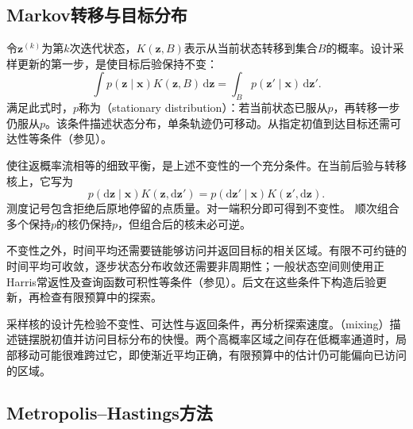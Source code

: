 \subsection{Markov转移与目标分布}
\label{sec:pgm-sampling-markov-kernel}

令$\bm z^{(k)}$为第$k$次迭代状态，$K(\bm z,B)$表示从当前状态转移到集合$B$的概率。设计采样更新的第一步，是使目标后验保持不变：
\begin{equation}
  \int p(\bm{z}\mid\bm{x})K(\bm{z},B)\,\mathrm{d}\bm{z}
    =\int_B p(\bm{z}'\mid\bm{x})\,\mathrm{d}\bm{z}'.
  \label{eq:pgm-sampling-invariance}
\end{equation}
满足此式时，$p$称为（stationary distribution）：若当前状态已服从$p$，再转移一步仍服从$p$。该条件描述状态分布，单条轨迹仍可移动。从指定初值到达目标还需可达性等条件（参见）。

使往返概率流相等的细致平衡，是上述不变性的一个充分条件。在当前后验与转移核上，它写为
\begin{equation}
  p(\mathrm{d}\bm{z}\mid\bm{x})K(\bm{z},\mathrm{d}\bm{z}')
    =p(\mathrm{d}\bm{z}'\mid\bm{x})K(\bm{z}',\mathrm{d}\bm{z}).
  \label{eq:pgm-sampling-detailed-balance}
\end{equation}
测度记号包含拒绝后原地停留的点质量。对一端积分即可得到不变性。
顺次组合多个保持$p$的核仍保持$p$，但组合后的核未必可逆。

不变性之外，时间平均还需要链能够访问并返回目标的相关区域。有限不可约链的时间平均可收敛，逐步状态分布收敛还需要非周期性；一般状态空间则使用正Harris常返性及查询函数可积性等条件（参见）。后文在这些条件下构造后验更新，再检查有限预算中的探索。

采样核的设计先检验不变性、可达性与返回条件，再分析探索速度。（mixing）描述链摆脱初值并访问目标分布的快慢。两个高概率区域之间存在低概率通道时，局部移动可能很难跨过它，即使渐近平均正确，有限预算中的估计仍可能偏向已访问的区域。

\subsection{Metropolis--Hastings方法}
\label{sec:pgm-sampling-mh}

